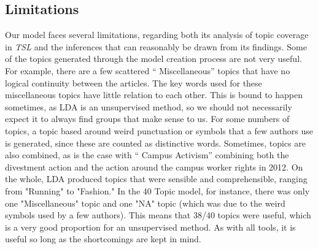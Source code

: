\documentclass[a4paper]{article}
\begin{document}
\subsection{Limitations}
Our model faces several limitations, regarding both its analysis of topic coverage in \textit{TSL} and the inferences that can reasonably be drawn from its findings. Some of the topics generated through the model creation process are not very useful. For example, there are a few scattered `` Miscellaneous''  topics that have no logical continuity between the articles. The key words used for these miscellaneous topics have little relation to each other. This is bound to happen sometimes, as LDA is an unsupervised method, so we should not necessarily expect it to always find groups that make sense to us. For some numbers of topics, a topic based around weird punctuation or symbols that a few authors use is generated, since these are counted as distinctive words. Sometimes, topics are also combined, as is the case with `` Campus Activism''  combining both the divestment action and the action around the campus worker rights in 2012. On the whole, LDA produced topics that were sensible and comprehensible, ranging from "Running" to "Fashion." In the 40 Topic model, for instance, there was only one "Miscellaneous" topic and one "NA" topic (which was due to the weird symbols used by a few authors). This means that 38/40 topics were useful, which is a very good proportion for an unsupervised method. As with all tools, it is useful so long as the shortcomings are kept in mind.
\end{document}
